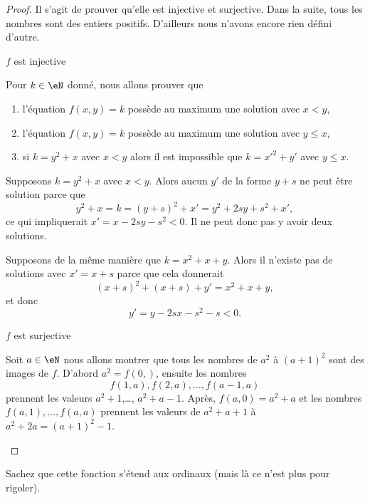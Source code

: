 \begin{proof}
    Il s'agit de prouver qu'elle est injective et surjective. Dans la suite, tous les nombres sont des entiers positifs. D'ailleurs nous n'avons encore rien défini d'autre.
    \begin{subproof}
        \item[\( f\) est injective]

            Pour \( k\in \eN\) donné, nous allons prouver que
            \begin{enumerate}
                \item
                    l'équation \( f(x,y)=k\) possède au maximum une solution avec \( x<y\),
                \item
                    l'équation \( f(x,y)=k\) possède au maximum une solution avec \( y\leq x\),
                \item
                    si \(   k=y^2+x \) avec \( x<y\) alors il est impossible que \( k=x'^2+y'\) avec \( y\leq x\).
            \end{enumerate}
            Supposons \( k=y^2+x\) avec \( x<y\). Alors aucun \( y'\) de la forme \( y+s\) ne peut être solution parce que
            \begin{equation}
                y^2+x= k=(y+s)^2+x'=y^2+2sy+s^2+x',
            \end{equation}
            ce qui impliquerait \( x'=x-2sy-s^2<0\). Il ne peut donc pas y avoir deux solutions.

            Supposons de la même manière que \( k=x^2+x+y\). Alors il n'existe pas de solutions avec \( x'=x+s\) parce que cela donnerait
            \begin{equation}
                (x+s)^2+(x+s)+y'=x^2+x+y,
            \end{equation}
            et donc
            \begin{equation}
                y'=y-2sx-s^2-s<0.
            \end{equation}
            
        \item[\( f\) est surjective]

            Soit \( a\in \eN\) nous allons montrer que tous les nombres de \( a^2\) à \( (a+1)^2\) sont des images de \( f\). D'abord \( a^2=f(0,)\), ensuite les nombres
            \begin{equation}
                f(1,a),f(2,a),\ldots, f(a-1,a)
            \end{equation}
            prennent les valeurs \( a^2+1\),\ldots, \( a^2+a-1\). Après, \( f(a,0)=a^2+a\) et les nombres \( f(a,1),\ldots, f(a,a)\) prennent les valeurs de \( a^2+a+1\) à \( a^2+2a=(a+1)^2-1\).
    \end{subproof}
\end{proof}
Sachez que cette fonction s'étend aux ordinaux (mais là ce n'est plus pour rigoler).


